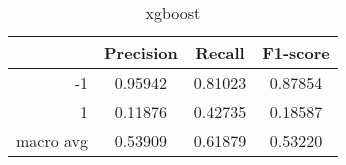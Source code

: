 \begin{table}[!h]
    \centering
    \renewcommand{\arraystretch}{1.5}
    \begin{tabular}{|r|c|c|c|}
        \hline
                  & Precision & Recall & F1-score \\ \hline
        -1        &     0.95942     &     0.81023   &    0.87854      \\ \hline
        1         &     0.11876      &     0.42735   &   0.18587       \\ \hline
        macro avg &      0.53909     &     0.61879   &    0.53220      \\ \hline
    \end{tabular}
    \caption{xgboost}
\end{table}
